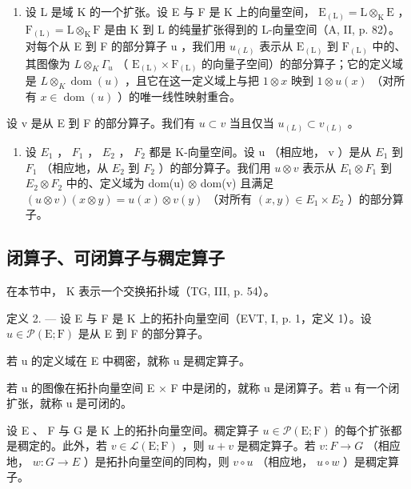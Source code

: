 \begin{enumerate}
\def\labelenumi{(\roman{enumi})}
\setcounter{enumi}{6}
\tightlist
\item
  设 L 是域 K 的一个扩张。设 E 与 F 是 K 上的向量空间， \(\mathrm{E}_{(\mathrm{L})} = \mathrm{L} \otimes_{\mathrm{K}} \mathrm{E}\) ， \(\mathrm{F}_{(\mathrm{L})} = \mathrm{L} \otimes_{\mathrm{K}} \mathrm{F}\) 是由 K 到 L 的纯量扩张得到的 L-向量空间（A, II, p. 82）。对每个从 E 到 F 的部分算子 u ，我们用 \(u_{(L)}\) 表示从 \(\mathrm{E}_{(\mathrm{L})}\) 到 \(\mathrm{F}_{(\mathrm{L})}\) 中的、其图像为 \(L \otimes_{K} \Gamma_{u}\) （ \(\mathrm{E}_{(\mathrm{L})} \times \mathrm{F}_{(\mathrm{L})}\) 的向量子空间）的部分算子；它的定义域是 \(L \otimes_{K} \operatorname{dom}(u)\) ，且它在这一定义域上与把 \(1 \otimes x\) 映到 \(1 \otimes u(x)\) （对所有 \(x \in \operatorname{dom}(u)\) ）的唯一线性映射重合。
\end{enumerate}

设 v 是从 E 到 F 的部分算子。我们有 \(u \subset v\) 当且仅当 \(u_{(L)} \subset v_{(L)}\) 。

\begin{enumerate}
\def\labelenumi{(\roman{enumi})}
\setcounter{enumi}{7}
\tightlist
\item
  设 \(E_{1}\) ， \(F_{1}\) ， \(E_{2}\) ， \(F_{2}\) 都是 K-向量空间。设 u （相应地， v ）是从 \(E_{1}\) 到 \(F_{1}\) （相应地，从 \(E_{2}\) 到 \(F_{2}\) ）的部分算子。我们用 \(u \otimes v\) 表示从 \(E_{1} \otimes F_{1}\) 到 \(E_{2} \otimes F_{2}\) 中的、定义域为 dom(u) \(\otimes\) dom(v) 且满足 \((u \otimes v)(x \otimes y) = u(x) \otimes v(y)\) （对所有 \((x, y) \in E_{1} \times E_{2}\) ）的部分算子。
\end{enumerate}

\subsection{闭算子、可闭算子与稠定算子}

在本节中， K 表示一个交换拓扑域（TG, III, p. 54）。

定义 2. --- 设 E 与 F 是 K 上的拓扑向量空间（EVT, I, p. 1，定义 1）。设 \(u \in \mathcal{P}(\mathrm{E};\mathrm{F})\) 是从 E 到 F 的部分算子。

若 u 的定义域在 E 中稠密，就称 u 是稠定算子。

若 u 的图像在拓扑向量空间 E × F 中是闭的，就称 u 是闭算子。若 u 有一个闭扩张，就称 u 是可闭的。

设 E 、 F 与 G 是 K 上的拓扑向量空间。稠定算子 \(u \in \mathcal{P}(\mathrm{E};\mathrm{F})\) 的每个扩张都是稠定的。此外，若 \(v \in \mathcal{L}(\mathrm{E};\mathrm{F})\) ，则 \(u + v\) 是稠定算子。若 \(v: F \to G\) （相应地， \(w: G \to E\) ）是拓扑向量空间的同构，则 \(v \circ u\) （相应地， \(u \circ w\) ）是稠定算子。


